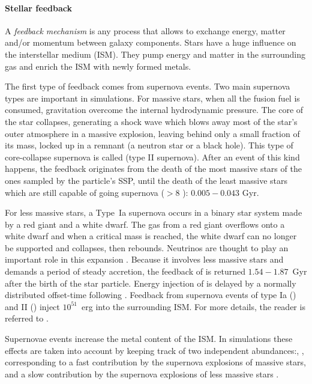 \paragraph{Stellar feedback}
A \emph{feedback mechanism} is any process that allows to exchange energy, matter and/or momentum between galaxy components. Stars have a huge influence on the interstellar medium (ISM). They pump energy and matter in the surrounding gas and enrich the ISM with newly formed metals.

The first type of feedback comes from supernova events. Two main supernova types are important in simulations. For massive stars, when all the fusion fuel is consumed, gravitation overcome the internal hydrodynamic pressure. The core of the star collapses, generating a shock wave which blows away most of the star's outer atmosphere in a massive explosion, leaving behind only a small fraction of its mass, locked up in a remnant (a neutron star or a black hole). This type of core-collapse supernova is called \snii{} (type II supernova).
After an event of this kind happens, the feedback originates from the death of the most massive stars of the ones sampled by the particle's SSP, until the death of the least massive stars which are still capable of going supernova ($>8$ \Msun ): $0.005 - 0.043$ Gyr.

For less massive stars, a Type~Ia supernova occurs in a binary star system made by a red giant and a white dwarf.
The gas from a red giant overflows onto a white dwarf and when a critical mass is reached, the white dwarf can no longer be supported and collapses, then rebounds. Neutrinos are thought to play an important role in this expansion \citep{Wongwathanarat2017}.
Because it involves less massive stars and demands a period of steady accretion, the feedback of \snia{} is returned $1.54 − 1.87$~Gyr after the birth of the star particle.
Energy injection of \snia{} is delayed by a normally distributed offset-time following \citet{Strolger2004}.
Feedback from supernova events of type Ia (\snia) and II (\snii) inject $10^{51}$~erg into the surrounding ISM. For more details, the reader is referred to \cite{Valcke2008}.


Supernovae events increase the metal content of the ISM. %
In simulations these effects are taken into account by keeping track of two independent abundances:\feh, \mgfe, corresponding to a fast contribution by the supernova explosions of massive stars, and a slow contribution by the supernova explosions of less massive stars \citep{DeRijcke2013, Vandenbroucke2016}.

